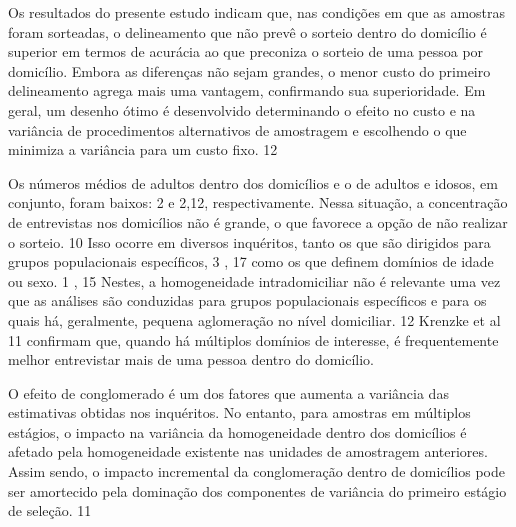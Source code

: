 \documentclass{article}
\begin{document}
Os resultados do presente estudo indicam que, nas condições em que as amostras foram sorteadas, o delineamento que não prevê o sorteio dentro do domicílio é superior em termos de acurácia ao que preconiza o sorteio de uma pessoa por domicílio. Embora as diferenças não sejam grandes, o menor custo do primeiro delineamento agrega mais uma vantagem, confirmando sua superioridade. Em geral, um desenho ótimo é desenvolvido determinando o efeito no custo e na variância de procedimentos alternativos de amostragem e escolhendo o que minimiza a variância para um custo fixo.%
12%


Os números médios de adultos dentro dos domicílios e o de adultos e idosos, em conjunto, foram baixos: 2 e 2,12, respectivamente. Nessa situação, a concentração de entrevistas nos domicílios não é grande, o que favorece a opção de não realizar o sorteio.%
10%
 Isso ocorre em diversos inquéritos, tanto os que são dirigidos para grupos populacionais específicos,%
3%
,%
17%
 como os que definem domínios de idade ou sexo.%
1%
,%
15%
 Nestes, a homogeneidade intradomiciliar não é relevante uma vez que as análises são conduzidas para grupos populacionais específicos e para os quais há, geralmente, pequena aglomeração no nível domiciliar.%
12%
 Krenzke et al%
11%
 confirmam que, quando há múltiplos domínios de interesse, é frequentemente melhor entrevistar mais de uma pessoa dentro do domicílio.

O efeito de conglomerado é um dos fatores que aumenta a variância das estimativas obtidas nos inquéritos. No entanto, para amostras em múltiplos estágios, o impacto na variância da homogeneidade dentro dos domicílios é afetado pela homogeneidade existente nas unidades de amostragem anteriores. Assim sendo, o impacto incremental da conglomeração dentro de domicílios pode ser amortecido pela dominação dos componentes de variância do primeiro estágio de seleção.%
11%
\end{document}
